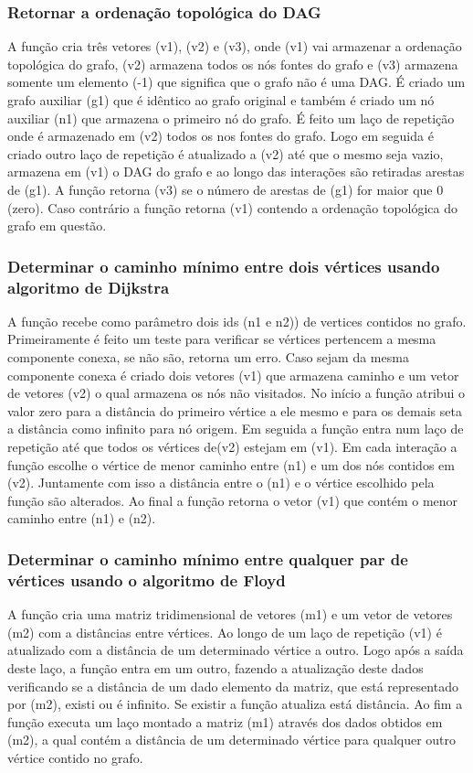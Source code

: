\documentclass[a4paper, 12pt]{article}
\begin{document}
\subsubsection{Retornar a ordenação topológica do DAG}
A função cria três vetores (v1), (v2) e (v3), onde (v1) vai armazenar a ordenação topológica do grafo, (v2) armazena todos os nós fontes do grafo e (v3) armazena somente um elemento (-1) que significa que o grafo não é uma DAG. É criado um  grafo auxiliar (g1) que é idêntico ao grafo original e também é criado um nó auxiliar (n1) que armazena o primeiro nó do grafo. É feito um laço de repetição onde é armazenado em (v2) todos os nos fontes do grafo. Logo em seguida é criado outro laço de repetição é atualizado a (v2) até que o mesmo seja vazio, armazena em (v1) o DAG do grafo e ao longo das interações são retiradas arestas de (g1). A função retorna (v3) se o número de arestas de (g1) for maior que 0 (zero). Caso contrário a função retorna (v1) contendo a ordenação topológica do grafo em questão.

\subsubsection{Determinar o caminho mínimo entre dois vértices usando algoritmo de Dijkstra}
A função recebe como parâmetro dois ids (n1 e n2)) de vertices contidos no grafo. Primeiramente é feito um teste para verificar se vértices pertencem a mesma componente conexa, se não são, retorna um erro. Caso sejam da mesma componente conexa é criado dois vetores (v1) que armazena caminho e um vetor de vetores (v2) o qual armazena os nós não visitados. No início  a função atribui o valor zero para a distância do primeiro vértice a ele mesmo e para os demais seta a distância como infinito para nó origem. Em seguida a função entra num laço de repetição até que todos os vértices de(v2) estejam em (v1). Em cada interação a função escolhe o vértice de menor caminho entre (n1) e um dos nós contidos em (v2). Juntamente com isso a distância entre o (n1) e o vértice escolhido pela função são alterados. Ao final a função retorna o vetor (v1) que contém o menor caminho entre (n1) e (n2).

\subsubsection{Determinar o caminho mínimo entre qualquer par de vértices usando o algoritmo de Floyd}
A função cria uma matriz tridimensional de vetores (m1) e um vetor de vetores (m2) com a distâncias entre vértices. Ao longo de um laço de repetição (v1) é atualizado com a distância  de um determinado vértice a outro. Logo após a saída deste laço, a função entra em um outro, fazendo a atualização deste dados verificando se a distância de um dado elemento da matriz, que está representado por (m2), existi ou é infinito. Se existir a função atualiza está distância. Ao fim a função executa um laço montado a matriz (m1) através dos dados obtidos em (m2), a qual contém a distância de um determinado vértice para qualquer outro vértice contido no grafo.
\end{document}
